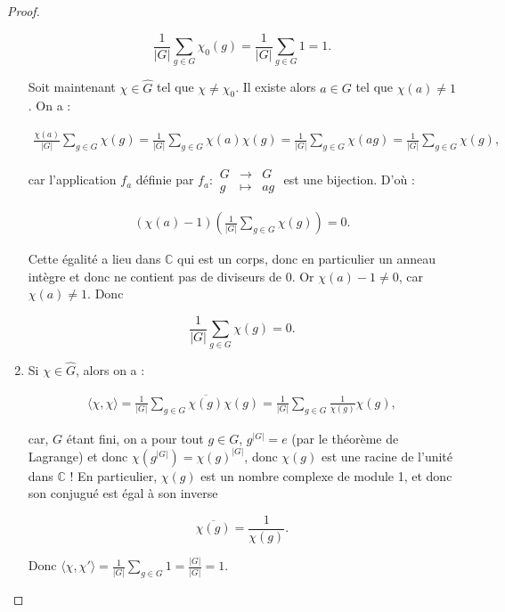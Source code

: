 \documentclass[french]{book}
\theoremstyle{definition}
\theoremstyle{remark}
\begin{document}
\begin{proof}
\begin{enumerate}
    \[\frac{1}{\lvert G \rvert} \sum_{g \in G}^{} \chi_0(g) = \frac{1}{\lvert G \rvert} \sum_{g \in G}^{} 1 = 1.\]

    Soit maintenant \(\chi \in \hat{G}\) tel que \(\chi \neq \chi_0\). Il existe alors \(a \in G\) tel que \(\chi(a) \neq 1\). On a :

    \begin{gather*}
      \frac{\chi(a)}{\lvert G \rvert} \sum_{g \in G}^{} \chi(g) = \frac{1}{\lvert G \rvert} \sum_{g \in G}^{} \chi(a) \chi(g) = \frac{1}{\lvert G \rvert}\sum_{g \in G}^{}  \chi(ag)= \frac{1}{\lvert G \rvert} \sum_{g \in G}^{} \chi(g),
    \end{gather*}

    car l'application \(f_a\) définie par \(f_a : \begin{matrix}
    G & \longrightarrow & G \\
    g & \longmapsto & ag
    \end{matrix}\) est une bijection. D'où :

    \begin{gather*}
      (\chi(a) - 1) \left(\frac{1}{\lvert G \rvert} \sum_{g \in G}^{} \chi(g) \right) = 0.
    \end{gather*}

    Cette égalité a lieu dans \(\mathbb{C}\) qui est un corps, donc en particulier un anneau intègre et donc ne contient pas de diviseurs de 0. Or \(\chi(a) -1 \neq 0\), car \(\chi(a) \neq 1\). Donc

    \[\frac{1}{\lvert G \rvert}\sum_{g \in G}^{} \chi(g) = 0.\]

    \item Si \(\chi \in \hat{G}\), alors on a :

    \begin{gather*}
      \langle \chi, \chi \rangle  = \frac{1}{\lvert G \rvert} \sum_{g \in G} \overline{\chi(g)} \chi(g) = \frac{1}{\lvert G \rvert} \sum_{g \in G} \frac{1}{\chi(g)} \chi(g),
    \end{gather*}

    car, \(G\) étant fini, on a pour tout \(g \in G\), \(g ^{\lvert G \rvert} = e\) (par le théorème de Lagrange) et donc \(\chi(g ^{\lvert G \rvert})= \chi(g) ^{\lvert G \rvert}\), donc \(\chi(g)\) est une racine de l'unité dans \(\mathbb{C}\) ! En particulier, \(\chi(g)\) est un nombre complexe de module 1, et donc son conjugué est égal à son inverse

    \[\overline{\chi(g)} = \frac{1}{\chi(g)}.\]

    Donc \(\langle \chi, \chi' \rangle = \frac{1}{\lvert G \rvert} \sum_{g \in G} 1 = \frac{\lvert G \rvert}{\lvert G \rvert}=1. \)


\end{enumerate}
\end{proof}
\end{document}
